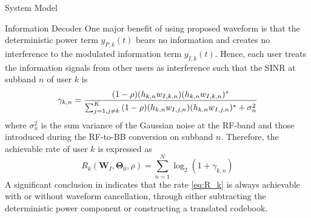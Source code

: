 \documentclass{IEEEtran}
\begin{document}
\begin{section}{System Model}
	\begin{subsection}{Information Decoder}
		One major benefit of using proposed waveform is that the deterministic power term $y_{P,k}(t)$ bears no information and creates no interference to the modulated information term $y_{I,k}(t)$. Hence, each user treats the information signals from other users as interference such that the SINR at subband $n$ of user $k$ is
		\begin{equation}\label{eq:gamma_{k,n}}
			\gamma_{k,n}=\frac{(1-\rho)(h_{k,n}w_{I,k,n})(h_{k,n}w_{I,k,n})^*}{\sum_{j=1,j{\ne}k}^K{(1-\rho)(h_{k,n}w_{I,j,n})(h_{k,n}w_{I,j,n})^*+\sigma_n^2}}
		\end{equation}
		where $\sigma_n^2$ is the sum variance of the Gaussian noise at the RF-band and those introduced during the RF-to-BB conversion on subband $n$. Therefore, the achievable rate of user $k$ is expressed as
		\begin{equation}\label{eq:R_k}
			R_k(\boldsymbol{W}_I,\boldsymbol{\Theta}_0,\rho)=\sum_{n=1}^N{\log_2(1+\gamma_{k,n})}
		\end{equation}
		A significant conclusion in \cite{Clerckx2018b} indicates that the rate \ref{eq:R_k} is always achievable with or without waveform cancellation, through either subtracting the deterministic power component or constructing a translated codebook.
	\end{subsection}


\end{section}
\end{document}
